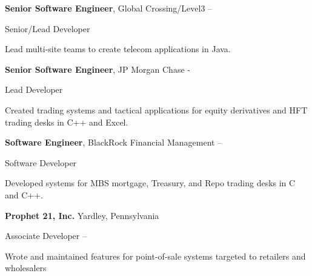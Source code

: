 \documentclass[letterpaper,MMMMyyyy,nonstopmode]{simpleresumecv}
\newif\ifLOCATION
\begin{document}
\begin{Body}
\Entry
\textbf{Senior Software Engineer}, Global Crossing/Level3
\hfill 
 -- 

Senior/Lead Developer
\ifLOCATION
\hfill
Rochester, New York
\fi

\begin{Detail}
Lead multi-site teams to create telecom applications in Java.

\end{Detail}

\Gap
\Entry
\textbf{Senior Software Engineer}, JP Morgan Chase
\hfill 
 - 

Lead Developer
\ifLOCATION
\hfill
New York, New York
\fi

\begin{Detail}
Created trading systems and tactical applications for equity derivatives and HFT trading desks in C++ and Excel.

\end{Detail}

\Entry
\textbf{Software Engineer}, BlackRock Financial Management
\hfill 
 --  

Software Developer
\ifLOCATION
\hfill
New York, New York
\fi

\begin{Detail}
Developed systems for MBS mortgage, Treasury, and Repo trading desks in C and C++.
\end{Detail}

\iffalse
\BigGap
\Entry
\textbf{Prophet 21, Inc.}
\hfill 
Yardley, Pennsylvania

Associate Developer
\hfill
{} --  

\begin{Detail}
\BulletItem
Wrote and maintained features for point-of-sale systems targeted to retailers and wholesalers


\end{Detail}
\end{Body}
\end{document}
